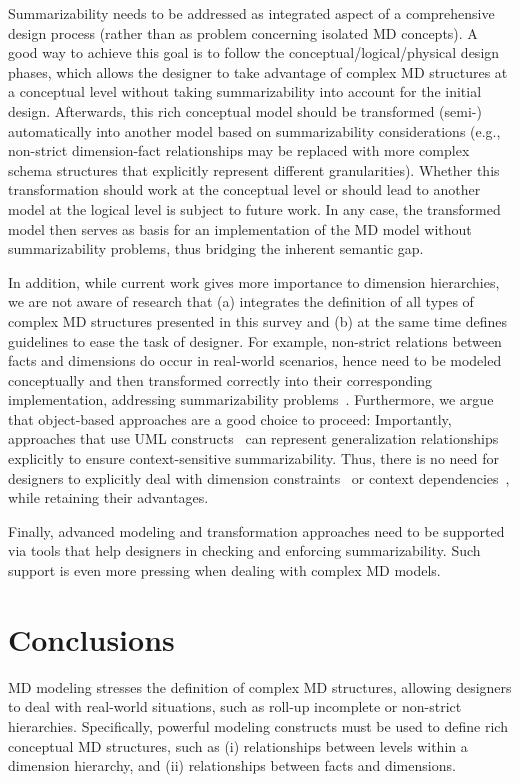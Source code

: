 Summarizability needs to be addressed as integrated aspect of a
comprehensive design process (rather than as problem concerning
isolated MD concepts). A good way to achieve this goal is to follow
the con\-cep\-tual/lo\-gi\-cal/phy\-si\-cal design phases, which
allows the designer to take advantage of complex MD structures at a
conceptual level without taking summarizability into account for the
initial design.  Afterwards, this rich conceptual model should be
transformed (semi-) automatically into another model based on
summarizability considerations (e.g., non-strict dimension-fact
relationships may be replaced with more complex schema structures
that explicitly represent different granularities). Whether this
transformation should work at the conceptual level or should lead to
another model at the logical level is subject to future work. In any
case, the transformed model then serves as basis for an
implementation of the MD model without summarizability problems,
thus bridging the inherent semantic gap.

In addition, while current work gives more importance to dimension
hierarchies, we are not aware of research that (a) integrates the
definition of all types of complex MD structures presented in this
survey and (b) at the same time defines guidelines to ease the task
of designer.  For example, non-strict relations between facts and
dimensions do occur in real-world scenarios, hence need to be
modeled conceptually and then transformed correctly into their
corresponding implementation, addressing summarizability
problems~\cite{DBLP:conf/dmdw/SongRME01,DBLP:journals/is/PedersenJD01}.
Furthermore, we argue that object-based approaches are a good choice
to proceed: Importantly, approaches that use UML
constructs~\cite{DBLP:journals/is/AbelloSS06,DBLP:journals/dke/Lujan-MoraTS06,DBLP:journals/dss/PratAC06}
can represent generalization relationships explicitly to ensure
context-sensitive summarizability.  Thus, there is no need for
designers to explicitly deal with dimension
constraints~\cite{DBLP:journals/tods/HurtadoGM05} or context
dependencies~\cite{DBLP:conf/dmdw/HusemannLV00,DBLP:journals/is/LechtenborgerV03},
while retaining their advantages.

Finally, advanced modeling and transformation approaches need to be
supported via tools that help designers in checking and enforcing
summarizability.  Such support is even more pressing when dealing
with complex MD models.

\section{Conclusions}
\label{a1:sec:conclusions} MD modeling stresses the definition of
complex MD structures, allowing designers to deal with real-world
situations, such as roll-up incomplete or non-strict hierarchies.
Specifically, powerful modeling constructs must be used to define
rich conceptual MD structures, such as (i) relationships between
levels within a dimension hierarchy, and (ii) relationships between
facts and dimensions.

